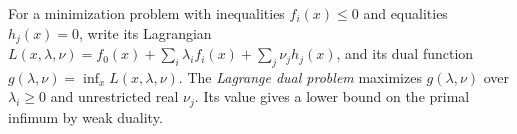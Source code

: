 
For a minimization problem with inequalities $f_i(x)\le0$ and equalities $h_j(x)=0$, write its Lagrangian $L(x,\lambda,\nu)=f_0(x)+\sum_i\lambda_i f_i(x)+\sum_j\nu_j h_j(x)$, and its dual function $g(\lambda,\nu)=\inf_x L(x,\lambda,\nu)$. The \emph{Lagrange dual problem} maximizes $g(\lambda,\nu)$ over $\lambda_i\ge0$ and unrestricted real $\nu_j$. Its value gives a lower bound on the primal infimum by weak duality.
